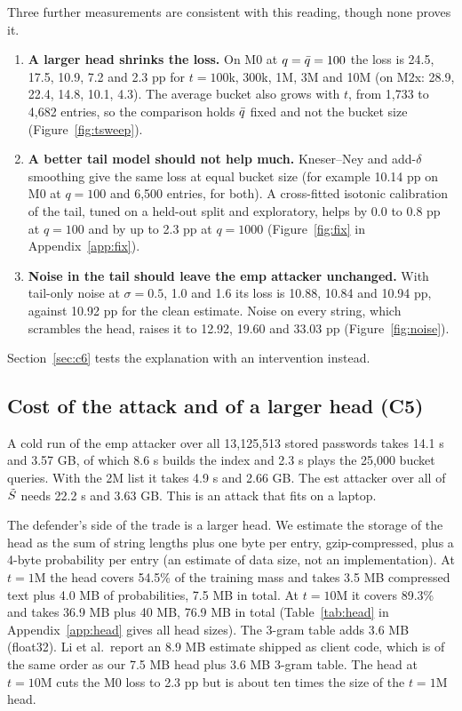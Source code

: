 Three further measurements are consistent with this reading, though none proves it.

\begin{enumerate}
\item \textbf{A larger head shrinks the loss.} On M0 at $q=\bar q=100$ the loss is 24.5, 17.5, 10.9, 7.2 and 2.3 pp for $t=100$k, 300k, 1M, 3M and 10M (on M2x: 28.9, 22.4, 14.8, 10.1, 4.3). The average bucket also grows with $t$, from 1,733 to 4,682 entries, so the comparison holds $\bar q$ fixed and not the bucket size (Figure~\ref{fig:tsweep}).
\item \textbf{A better tail model should not help much.} Kneser--Ney and add-$\delta$ smoothing give the same loss at equal bucket size (for example 10.14 pp on M0 at $q=100$ and 6,500 entries, for both). A cross-fitted isotonic calibration of the tail, tuned on a held-out split and exploratory, helps by 0.0 to 0.8 pp at $q=100$ and by up to 2.3 pp at $q=1000$ (Figure~\ref{fig:fix} in Appendix~\ref{app:fix}).
\item \textbf{Noise in the tail should leave the emp attacker unchanged.} With tail-only noise at $\sigma=0.5$, 1.0 and 1.6 its loss is 10.88, 10.84 and 10.94 pp, against 10.92 pp for the clean estimate. Noise on every string, which scrambles the head, raises it to 12.92, 19.60 and 33.03 pp (Figure~\ref{fig:noise}).
\end{enumerate}

Section~\ref{sec:c6} tests the explanation with an intervention instead.

\subsection{Cost of the attack and of a larger head (C5)}\label{sec:c5}

A cold run of the emp attacker over all 13,125,513 stored passwords takes 14.1 s and 3.57 GB, of which 8.6 s builds the index and 2.3 s plays the 25,000 bucket queries. With the 2M list it takes 4.9 s and 2.66 GB. The est attacker over all of $\tilde S$ needs 22.2 s and 3.63 GB. This is an attack that fits on a laptop.

The defender's side of the trade is a larger head. We estimate the storage of the head as the sum of string lengths plus one byte per entry, gzip-compressed, plus a 4-byte probability per entry (an estimate of data size, not an implementation). At $t=1$M the head covers 54.5\% of the training mass and takes 3.5 MB compressed text plus 4.0 MB of probabilities, 7.5 MB in total. At $t=10$M it covers 89.3\% and takes 36.9 MB plus 40 MB, 76.9 MB in total (Table~\ref{tab:head} in Appendix~\ref{app:head} gives all head sizes). The 3-gram table adds 3.6 MB (float32). Li et al.\ report an 8.9 MB estimate shipped as client code, which is of the same order as our 7.5 MB head plus 3.6 MB 3-gram table. The head at $t=10$M cuts the M0 loss to 2.3 pp but is about ten times the size of the $t=1$M head.

